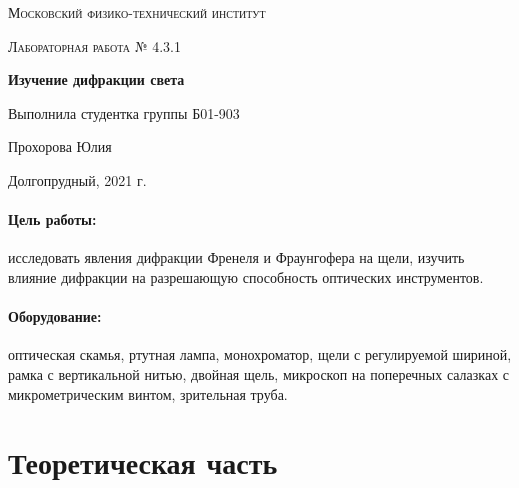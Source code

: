 \documentclass[a4paper]{article}
\begin{document}
\begin{titlepage}
	\centering
	\vspace{5cm}
	{\scshape\LARGE Московский физико-технический институт \par}

	\vspace{3cm}
	{\scshape\Large Лабораторная работа № 4.3.1 \par}
	\vspace{1cm}
	{\huge\bfseries  Изучение дифракции света\par}
	\vspace{1cm}
	\vfill
\begin{flushright}
	{\large Выполнила студентка группы Б01-903}\par
	\vspace{0.3cm}
	{\LARGE Прохорова Юлия}
\end{flushright}
	
	\vfill

	Долгопрудный, 2021 г.
\end{titlepage}



\newpage


\newpage

\newcommand{\RNumb}[1]{\uppercase\expandafter{\romannumeral #1\relax}}

\pagestyle{fancy} 
\fancyhead{} 
\fancyfoot[C]{\noindent\rule{\textwidth}{0.4pt} \thepage}

\paragraph*{Цель работы:} исследовать явления дифракции Френеля и Фраунгофера на щели, изучить влияние дифракции на разрешающую способность оптических инструментов.
	
\paragraph*{Оборудование:} оптическая скамья, ртутная лампа, монохроматор, щели с регулируемой шириной, рамка с вертикальной
нитью, двойная щель, микроскоп на поперечных салазках с микрометрическим винтом, зрительная труба.

\section{Теоретическая часть}
	
\end{document}
